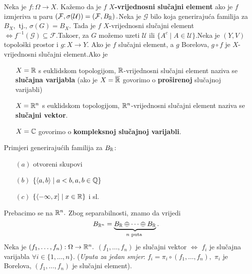 \documentclass{article}
\begin{document}
Neka je \(f:\Omega\to X.\) Kažemo da je \(f\) \textbf{\(X\)-vrijednosni slučajni element} ako je \(f\) izmjeriva u paru \(\left(\mathcal F,\sigma(\mathcal U)\right)=\left(\mathcal F,B_{\Bbb R}\right).\)\newline\newline Neka je \(\mathcal G\) bilo koja generirajuća familija za \(B_X,\) tj., \(\sigma(G)=B_X.\) Tada je \(f\) \(X\)-vrijednosni slučajni element \(\Leftrightarrow f^{-1}(\mathcal G)\subseteq\mathcal F.\)\newline Tako\dj{}er, za \(G\) možemo uzeti \(\mathcal U\) ili \(\{A^c\mid A\in\mathcal U\}.\)\newline\newline Neka je \((Y,V)\) topološki prostor i \(g:X\to Y.\) Ako je \(f\) slučajni element, a \(g\) Borelova, \(g\circ f\) je \(X\)-vrijednosni slučajni element.\newline\newline Ako je \begin{itemize}
    \item[\ding{228}] \(X=\Bbb R\) s euklidskom topologijom, \(\Bbb R\)-vrijednosni slučajni element naziva se \textbf{slučajna varijabla} (ako je \(X=\overline{\Bbb R}\) govorimo o \textbf{proširenoj} slučajnoj varijabli)
    \item[\ding{228}] \(X=\Bbb R^n\) s euklidskom topologijom, \(\Bbb R^n\)-vrijednosni slučajni element naziva se \textbf{slučajni vektor}. 
    \item[\ding{228}] \(X=\Bbb C\) govorimo o \textbf{kompleksnoj slučajnoj varijabli}. 
\end{itemize}
Primjeri generirajućih familija za \(B_{\Bbb R}\):\begin{itemize}
    \item[\((a)\)] otvoreni skupovi
    \item[\((b)\)] \(\left\{\langle a,b\rangle\mid a<b,a,b\in\Bbb Q\right\}\) 
    \item[\((c)\)] \(\left\{\langle-\infty,x]\mid x\in\Bbb R\right\}\) i sl. 
\end{itemize}
Prebacimo se na \(\Bbb R^n.\) Zbog separabilnosti, znamo da vrijedi \[B_{\Bbb R^n}=\underbrace{B_{\Bbb R}\oplus\cdots\oplus B_{\Bbb R}}_{n\text{ puta }}.\] Neka je \((f_1,\ldots,f_n):\Omega\to\Bbb R^n.\) \((f_1,\ldots,f_n)\) je slučajni vektor \(\Leftrightarrow\) \(f_i\) je slučajna varijabla \(\forall i\in\{1,\ldots,n\}.\) (\textit{Uputa za jedan smjer}: \(f_i=\pi_i\circ (f_1,\ldots,f_n),\) \(\pi_i\) je Borelova, \((f_1,\ldots,f_n)\) je slučajni element).
\newpage
\end{document}
